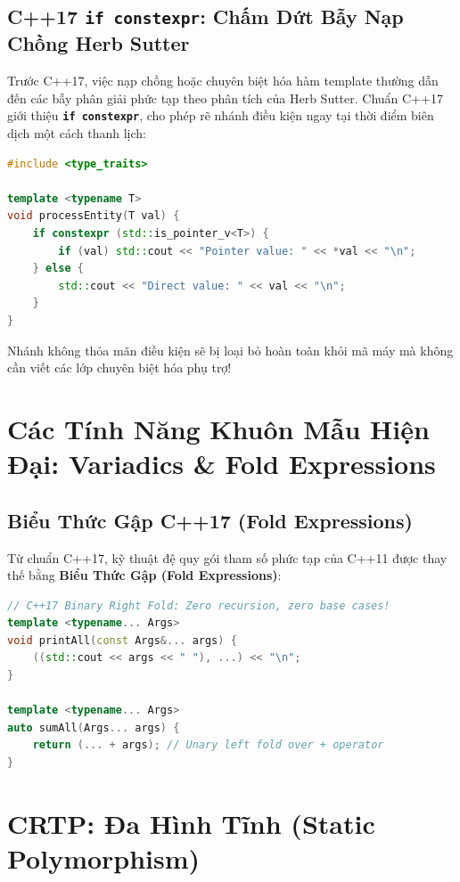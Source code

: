 \documentclass[12pt,a4paper,oneside]{book}
\begin{document}
\subsection{C++17 \texttt{if constexpr}: Chấm Dứt Bẫy Nạp Chồng Herb Sutter}

Trước C++17, việc nạp chồng hoặc chuyên biệt hóa hàm template thường dẫn đến các bẫy phân giải phức tạp theo phân tích của Herb Sutter. Chuẩn C++17 giới thiệu \textbf{\texttt{if constexpr}}, cho phép rẽ nhánh điều kiện ngay tại thời điểm biên dịch một cách thanh lịch:

\begin{lstlisting}[language=C++]
#include <type_traits>

template <typename T>
void processEntity(T val) {
    if constexpr (std::is_pointer_v<T>) {
        if (val) std::cout << "Pointer value: " << *val << "\n";
    } else {
        std::cout << "Direct value: " << val << "\n";
    }
}
\end{lstlisting}
Nhánh không thỏa mãn điều kiện sẽ bị loại bỏ hoàn toàn khỏi mã máy mà không cần viết các lớp chuyên biệt hóa phụ trợ!

\section{Các Tính Năng Khuôn Mẫu Hiện Đại: Variadics \& Fold Expressions}

\subsection{Biểu Thức Gập C++17 (Fold Expressions)}

Từ chuẩn C++17, kỹ thuật đệ quy gói tham số phức tạp của C++11 được thay thế bằng \textbf{Biểu Thức Gập (Fold Expressions)}:

\begin{lstlisting}[language=C++]
// C++17 Binary Right Fold: Zero recursion, zero base cases!
template <typename... Args>
void printAll(const Args&... args) {
    ((std::cout << args << " "), ...) << "\n";
}

template <typename... Args>
auto sumAll(Args... args) {
    return (... + args); // Unary left fold over + operator
}
\end{lstlisting}

\section{CRTP: Đa Hình Tĩnh (Static Polymorphism)}
\end{document}
